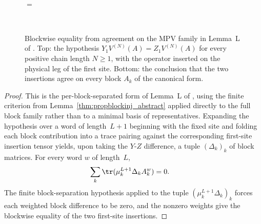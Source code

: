 \begin{figure}[ht]
\begin{center}
        \tenkzkernel
        \begin{tenkz}[rows={op,ket}, cols=1]
             \\
        \end{tenkz}
        $ = $
        \begin{tenkz}[rows={op,ket}, cols=1]
             \\
        \end{tenkz}
    \end{center}
    \caption{Blockwise equality from agreement on the MPV family in Lemma~L of
        \cite[Appendix~C.3, lines~1835--1846]{Cirac2016MPDO_arXiv}. Top: the
        hypothesis $Y_1V^{(N)}(A)=Z_1V^{(N)}(A)$ for every positive chain length
        $N\geq1$, with the operator inserted on the physical leg of the first
        site. Bottom: the conclusion that the two insertions agree on every
        block $A_k$ of the canonical form.}
    \label{fig:mpdo_first_site_insertion_agreement}
\end{figure}

\begin{proof}
    \leanok
    This is the per-block-separated form of Lemma~L of
    \cite[Appendix~C.3, lines~1835--1846]{Cirac2016MPDO_arXiv}, using the finite
    criterion from Lemma~\ref{thm:propblockinj_abstract} applied directly to the
    full block family rather than to a minimal basis of representatives.
    Expanding the hypothesis over a word of length~$L+1$ beginning with the
    fixed site and folding each block contribution into a trace pairing
    against the corresponding first-site insertion tensor yields, upon taking the
    $Y$-$Z$ difference, a tuple $(\Delta_k)_k$ of block matrices. For every
    word $w$ of length~$L$,
    \begin{align}
        \sum_k \tr(\mu_k^{L+1}\Delta_k A_k^w)
         & =0.
        \notag
    \end{align}
    The finite block-separation hypothesis applied to the tuple
    $(\mu_k^{L+1}\Delta_k)_k$ forces each weighted block difference to be
    zero, and the nonzero weights give the blockwise equality of the two
    first-site insertions.
\end{proof}

